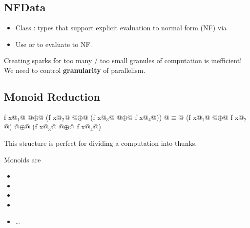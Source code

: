 


\subsection{NFData}

\begin{itemize}
    \item Class : types  that support explicit evaluation to normal form (NF) via 
    \item Use  or  to evaluate  to NF.
\end{itemize}



Creating sparks for too many / too small granules of computation is inefficient!
We need to control \textbf{granularity} of parallelism.





\subsection{Monoid Reduction}

\begin{codebox}[haskell]
    f x@$_1$@ @$\oplus$@ (f x@$_2$@ @$\oplus$@ (f x@$_3$@ @$\oplus$@ f x@$_4$@))
@$\equiv$@ (f x@$_1$@ @$\oplus$@ f x@$_2$@) @$\oplus$@ (f x@$_3$@ @$\oplus$@ f x@$_4$@)
\end{codebox}

This structure is perfect for dividing a computation into thunks.

Monoids are
\begin{itemize}
    \item {}
    \item \codeline{((++), [])}
    \item {}
    \item {}
    \item \dots
\end{itemize}


